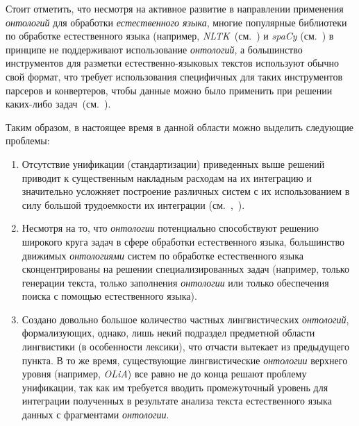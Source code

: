 Стоит отметить, что несмотря на активное развитие в направлении применения \textit{онтологий} для обработки \textit{естественного языка}, многие популярные библиотеки по обработке естественного языка (например, \textit{NLTK}~(см.~) и \textit{spaCy} (см.~) в принципе не поддерживают использование \textit{онтологий}, а большинство инструментов для разметки естественно-языковых текстов используют обычно свой формат, что требует использования специфичных для таких инструментов парсеров и конвертеров, чтобы данные можно было применить при решении каких-либо задач~(см.~).

Таким образом, в настоящее время в данной области можно выделить следующие проблемы:
\begin{enumerate}
    \item Отсутствие унификации (стандартизации) приведенных выше решений приводит к существенным накладным расходам на их интеграцию и значительно усложняет построение различных систем с их использованием в силу большой трудоемкости их интеграции (см.~,~).
    \item Несмотря на то, что \textit{онтологии} потенциально способствуют решению широкого круга задач в сфере обработки естественного языка, большинство движимых \textit{онтологиями} систем по обработке естественного языка сконцентрированы на решении специализированных задач (например, только генерации текста, только заполнения \textit{онтологии} или только обеспечения поиска с помощью естественного языка).
    \item Создано довольно большое количество частных лингвистических \textit{онтологий}, формализующих, однако, лишь некий подраздел предметной области лингвистики (в особенности лексики), что отчасти вытекает из предыдущего пункта.
    В то же время, существующие лингвистические \textit{онтологии} верхнего уровня (например, \textit{OLiA}) все равно не до конца решают проблему унификации, так как им требуется вводить промежуточный уровень для интеграции полученных в результате анализа текста естественного языка данных с фрагментами \textit{онтологии}.
\end{enumerate}

